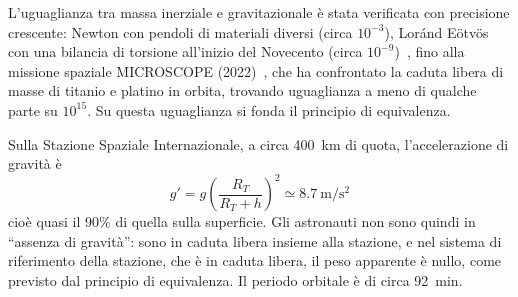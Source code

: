 \begin{Es}
  L'uguaglianza tra massa inerziale e gravitazionale è stata verificata con precisione crescente: Newton con pendoli di materiali diversi (circa $10^{-3}$), Loránd Eötvös con una bilancia di torsione all'inizio del Novecento (circa $10^{-9}$)~\cite{eotvos1922}, fino alla missione spaziale MICROSCOPE (2022)~\cite{microscope2022}, che ha confrontato la caduta libera di masse di titanio e platino in orbita, trovando uguaglianza a meno di qualche parte su $10^{15}$. Su questa uguaglianza si fonda il principio di equivalenza.
\end{Es}

\begin{Es}
  Sulla Stazione Spaziale Internazionale, a circa \SI{400}{\kilo\meter} di quota, l'accelerazione di gravità è
  \[
    g'=g\left(\frac{R_T}{R_T+h}\right)^2\simeq\SI{8.7}{\meter\per\second\squared}
  \]
  cioè quasi il 90\% di quella sulla superficie. Gli astronauti non sono quindi in ``assenza di gravità'': sono in caduta libera insieme alla stazione, e nel sistema di riferimento della stazione, che è in caduta libera, il peso apparente è nullo, come previsto dal principio di equivalenza. Il periodo orbitale è di circa \SI{92}{\minute}.
\end{Es}
